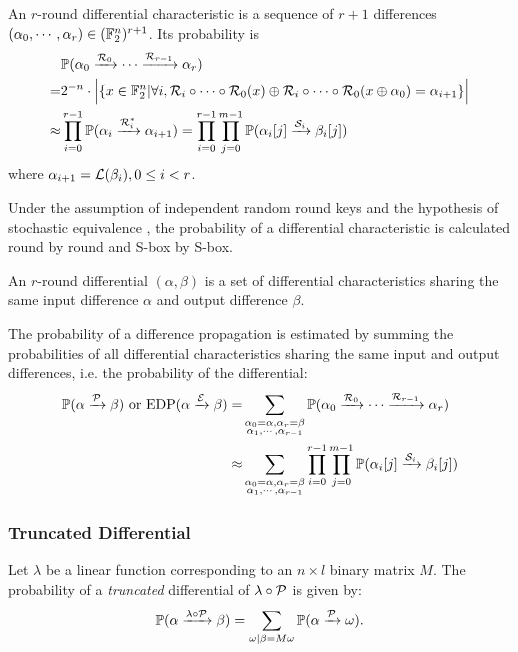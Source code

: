 \begin{definition}
    An $r$-round differential characteristic is a sequence of $r+1$ differences $(\alpha_0,\cdots,\alpha_r)\in(\mathbb{F}_2^n)^{r+1}$. Its probability is
    \begin{align*}
        &\mathbb{P}(\alpha_0\xrightarrow{\mathcal{R}_0}\cdots\xrightarrow{\mathcal{R}_{r-1}}\alpha_r)\\
        =&2^{-n}\cdot\Big|\{x\in\mathbb{F}_2^n|\forall i, \mathcal{R}_i\circ\cdots\circ\mathcal{R}_0(x)\oplus\mathcal{R}_i\circ\cdots\circ\mathcal{R}_0(x\oplus\alpha_0)=\alpha_{i+1}\}\Big|\\
        \approx&\prod\limits_{i=0}^{r-1}\mathbb{P}(\alpha_i\xrightarrow{\mathcal{R}_i^*}\alpha_{i+1})
        =\prod\limits_{i=0}^{r-1}\prod\limits_{j=0}^{m-1}\mathbb{P}(\alpha_i[j]\xrightarrow{\mathcal{S}_i}\beta_i[j])
    \end{align*}
    where $\alpha_{i+1}=\mathcal{L}(\beta_i),0\leq i<r$. 
\end{definition}

Under the assumption of independent random round keys and the hypothesis of stochastic equivalence \cite{lai1991markov}, the probability of a differential characteristic is calculated round by round and S-box by S-box.

\begin{definition}[Differential]
    An $r$-round differential $(\alpha,\beta)$ is a set of differential characteristics sharing the same input difference $\alpha$ and output difference $\beta$. 
\end{definition}

The probability of a difference propagation is estimated by summing the probabilities of all differential characteristics sharing the same input and output differences, i.e. the probability of the differential:
\begin{align*}
    \mathbb{P}(\alpha\xrightarrow{\mathcal{P}}\beta) \text{ or } \text{EDP}(\alpha\xrightarrow{\mathcal{E}}\beta)=&\sum\limits_{\substack{\alpha_0=\alpha,\alpha_r=\beta\\\alpha_1,\cdots,\alpha_{r-1}}}\mathbb{P}(\alpha_0\xrightarrow{\mathcal{R}_0}\cdots\xrightarrow{\mathcal{R}_{r-1}}\alpha_r)\\
    \approx&\sum\limits_{\substack{\alpha_0=\alpha,\alpha_r=\beta\\\alpha_1,\cdots,\alpha_{r-1}}}\prod\limits_{i=0}^{r-1}\prod\limits_{j=0}^{m-1}\mathbb{P}(\alpha_i[j]\xrightarrow{\mathcal{S}_i}\beta_i[j])
\end{align*}

\subsubsection{Truncated Differential \cite{daemen2002design}}
Let $\lambda$ be a linear function corresponding to an $n\times l$ binary matrix $M$. The probability of a \textit{truncated} differential of $\lambda\circ\mathcal{P}$ is given by:
\[
    \mathbb{P}(\alpha\xrightarrow{\lambda\circ\mathcal{P}}\beta)=\sum\limits_{\omega|\beta=M\omega}\mathbb{P}(\alpha\xrightarrow{\mathcal{P}}\omega).
\]

